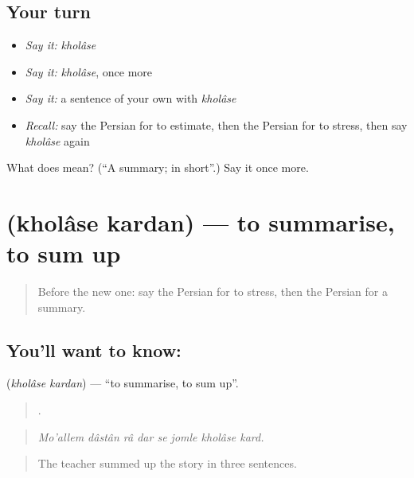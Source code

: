 \subsection*{Your turn}
\begin{itemize}
\raggedright
  \item \emph{Say it:} \emph{kholâse}
  \item \emph{Say it:} \emph{kholâse}, once more
  \item \emph{Say it:} a sentence of your own with \emph{kholâse}
  \item \emph{Recall:} say the Persian for to estimate, then the Persian for to stress, then say \emph{kholâse} again
\end{itemize}

\begin{tcolorbox}[breakable,colback=teal!4,colframe=teal!35!black,title={Before you move on}]
What does  mean? (\textquotedblleft{}A summary; in short\textquotedblright{}.) Say it once more.
\end{tcolorbox}
\section[\texorpdfstring{\fa{خلاصه} \fa{کردن} (kholâse kardan)}{خلاصه کردن (kholâse kardan)}]{  (kholâse kardan) — to summarise, to sum up}

\label{lesson:FA-C313-kholase-kardan}



\begin{quote}
Before the new one: say the Persian for to stress, then the Persian for a summary.
\end{quote}

\subsection*{You'll want to know:  }
\textbf{ } (\emph{kholâse kardan}) — \textquotedblleft{}to summarise, to sum up\textquotedblright{}.

\begin{quote}
       .
\end{quote}

\begin{quote}
\emph{Mo'allem dâstân râ dar se jomle kholâse kard.}
\end{quote}

\begin{quote}
The teacher summed up the story in three sentences.
\end{quote}

